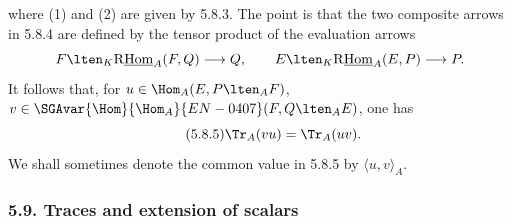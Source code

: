 where (1) and (2) are given by 5.8.3. The point is that the two composite arrows in 5.8.4 are defined by the tensor product of the evaluation arrows
\[
F\lten_K\mathrm{R}\underline{\mathrm{Hom}}_A(F,Q)\longrightarrow Q,\qquad
E\lten_K\mathrm{R}\underline{\mathrm{Hom}}_A(E,P)\longrightarrow P.
\]
It follows that, for $u\in\Hom_A(E,P\lten_AF)$, $v\in\SGAvar{\Hom}{\Hom_A}{EN-0407}(F,Q\lten_AE)$, one has
\begin{equation}\tag{5.8.5}
\Tr_A(vu)=\Tr_A(uv).
\end{equation}
We shall sometimes denote the common value in 5.8.5 by $\langle u,v\rangle_A$.

\subsubsection*{5.9. Traces and extension of scalars}

